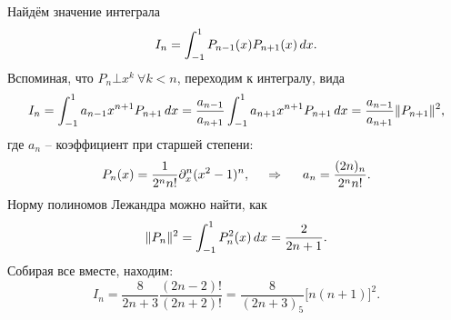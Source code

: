 Найдём значение интеграла 
\begin{equation*}
    I_n = \int_{-1}^{1} P_{n-1}(x) P_{n+1}(x) \, d x.
\end{equation*}
Вспоминая, что $P_n \bot x^k \ \forall  k < n$, переходим к интегралу, вида
\begin{equation*}
    I_n = \int_{-1}^{1} a_{n-1} x^{n+1} P_{n+1} \, d x = \frac{a_{n-1}}{a_{n+1}}
    \int_{-1}^{1} a_{n+1} x^{n+1} P_{n+1} \, d x = \frac{a_{n-1}}{a_{n+1}} \|P_{n+1}\|^2,
\end{equation*}
где $a_n$ -- коэффициент при старшей степени:
\begin{equation*}
    P_n (x) = \frac{1}{2^n n!} \partial_x^n (x^2-1)^n,
    \hspace{0.5cm} \Rightarrow \hspace{0.5cm}
    a_n = \frac{(2n)_n}{2^n n!}.
\end{equation*}
Норму полиномов Лежандра можно найти, как
\begin{equation*}
     \|P_n\|^2 = \int_{-1}^{1} P_n^2 (x) \, d x = \frac{2}{2n+1}.
 \end{equation*} 
 Собирая все вместе, находим:
 \begin{equation*}
     I_n = \frac{8}{2n+3} \frac{(2n-2)!}{(2n+2)!} =  \frac{8}{(2n+3)_5}\big[n (n+1)\big]^2.
 \end{equation*}

